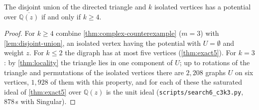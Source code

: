 \documentclass[final]{siamart0516}
\numberwithin{theorem}{section}
\numberwithin{equation}{section}
\theoremstyle{siamnonum}
\theoremstyle{plain}
\newcommand{\code}[1]{{\ttfamily\nolinkurl{#1}}}
\newcommand{\QQ}{\mathbb{Q}}
\newcommand{\Qz}{\QQ(z)}
\newcommand{\Qzbar}{\overline{\QQ(z)}}
\begin{document}
\begin{proposition}\label{prop:c3-minimal}
The disjoint union of the directed triangle and $k$ isolated vertices has a potential over $\Qzbar$ if and only if $k\ge4$.
\end{proposition}
\begin{proof}
For $k\ge4$ combine \cref{thm:complex-counterexample} ($m=3$) with \cref{lem:disjoint-union}, an isolated vertex having the potential with $U=\emptyset$ and weight $z$. For $k\le2$ the digraph has at most five vertices (\cref{thm:exact5}). For $k=3$: by \cref{thm:locality} the triangle lies in one component of $U$; up to rotations of the triangle and permutations of the isolated vertices there are $2{,}208$ graphs $U$ on six vertices, $1{,}928$ of them with this property, and for each of these the saturated ideal of \cref{thm:exact5} over $\Qz$ is the unit ideal (\code{scripts/search6_c3k3.py}, $878$\,s with Singular).
\end{proof}
\end{document}
